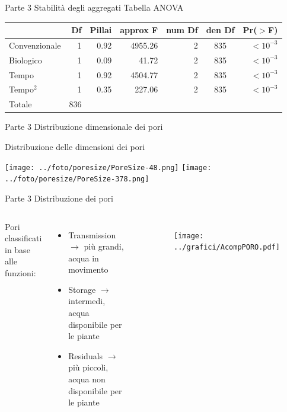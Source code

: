\documentclass[xcolor={usenames, table, x11names}, final, 10pt]{beamer}
\begin{document}
\begin{frame}[label=Anova]{Parte 3 \small{Stabilità degli aggregati}}
  \hyperlink{finale}{}
  \footnotesize
  Tabella ANOVA 
  \begin{table}
    \centering
    \begin{tabular}{lrrrrcr}
      \toprule
      & Df&Pillai& approx F & num Df & den Df & Pr($>$F) \\ 
      \midrule
      Convenzionale & 1 & 0.92 & 4955.26  &      2 &    835 & $<10^{-3}$\\ 
      Biologico     & 1 & 0.09 & 41.72    &      2 &    835 & $<10^{-3}$\\ 
      Tempo         & 1 & 0.92 & 4504.77  &      2 &    835 & $<10^{-3}$\\ 
      Tempo$^2$     & 1 & 0.35 & 227.06   &      2 &    835 & $<10^{-3}$\\ 
      Totale        & 836 &    &          &        &        &          \\ 
      \bottomrule
    \end{tabular}
  \end{table}
\end{frame}

\begin{frame}{Parte 3 \small{Distribuzione dimensionale dei pori}}
\begin{center}
\LARGE Distribuzione delle dimensioni dei pori

\vspace{1.5cm}

    \texttt{[image: ../foto/poresize/PoreSize-48.png]}
    \texttt{[image: ../foto/poresize/PoreSize-378.png]}
\end{center}
\end{frame}


\begin{frame}[label=Porosimetria]{Parte 3 \small{Distribuzione dei pori}}
\begin{columns}
\footnotesize{
Pori classificati in base alle funzioni:
\begin{itemize}
    \item Transmission $\rightarrow$ più grandi, acqua in movimento
    \item Storage $\rightarrow$ intermedi, acqua disponibile per le
      piante
    \item Residuals $\rightarrow$ più piccoli, acqua non disponibile
      per le piante
\end{itemize}}
\hyperlink{finale}{}
  
  \begin{figure}
    \texttt{[image: ../grafici/AcompPORO.pdf]}
  \end{figure}

\end{columns}
\end{frame}
\end{document}
